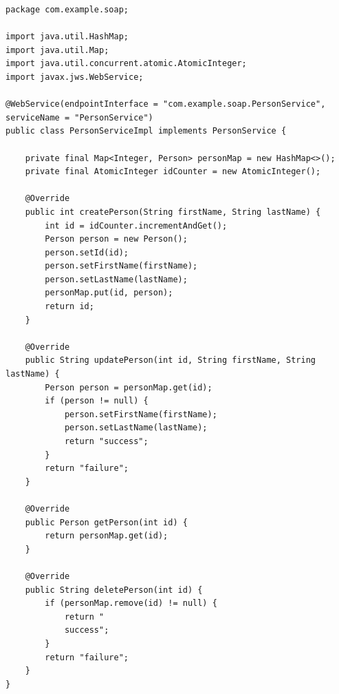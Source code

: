 \begin{lstlisting}[caption={SOAP Person Service Implementierung},captionpos=b,label={lst:soap_person_impl}]
package com.example.soap;

import java.util.HashMap;
import java.util.Map;
import java.util.concurrent.atomic.AtomicInteger;
import javax.jws.WebService;

@WebService(endpointInterface = "com.example.soap.PersonService", serviceName = "PersonService")
public class PersonServiceImpl implements PersonService {

    private final Map<Integer, Person> personMap = new HashMap<>();
    private final AtomicInteger idCounter = new AtomicInteger();

    @Override
    public int createPerson(String firstName, String lastName) {
        int id = idCounter.incrementAndGet();
        Person person = new Person();
        person.setId(id);
        person.setFirstName(firstName);
        person.setLastName(lastName);
        personMap.put(id, person);
        return id;
    }

    @Override
    public String updatePerson(int id, String firstName, String lastName) {
        Person person = personMap.get(id);
        if (person != null) {
            person.setFirstName(firstName);
            person.setLastName(lastName);
            return "success";
        }
        return "failure";
    }

    @Override
    public Person getPerson(int id) {
        return personMap.get(id);
    }

    @Override
    public String deletePerson(int id) {
        if (personMap.remove(id) != null) {
            return "
            success";
        }
        return "failure";
    }
}
\end{lstlisting}

